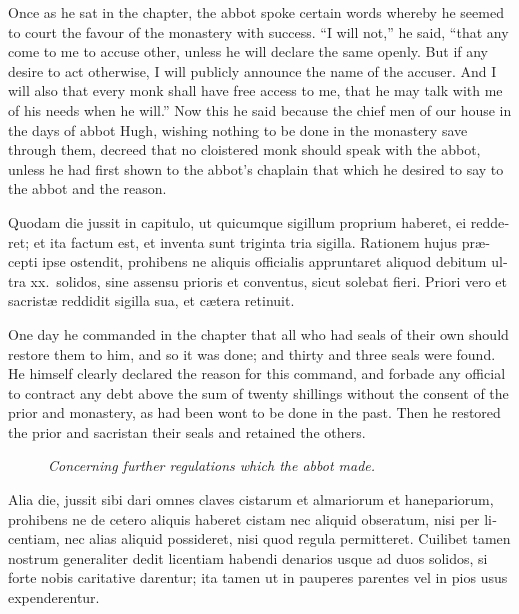\documentclass{book}
\newcommand{\blockhead}[4][]{
\begin{figure}
\centering
\vspace{#4}
\parbox{2.75cm}{\begin{center}\footnotesize \color{BrickRed} \emph{#2}\\ #1 \end{center}}
\end{figure}
}
\begin{document}
\begin{paracol}{2}
\begin{otherlanguage}{latin}
\end{otherlanguage}

\switchcolumn

Once as he sat in the chapter, the abbot spoke certain words whereby he seemed to court the favour of the monastery with success. ``I will not,'' he said, ``that any come to me to accuse other, unless he will declare the same openly. But if any desire to act otherwise, I will publicly announce the name of the accuser. And I will also that every monk shall have free access to me, that he may talk with me of his needs when he will.'' Now this he said because the chief men of our house in the days of abbot Hugh, wishing nothing to be done in the monastery save through them, decreed that no cloistered monk should speak with the abbot, unless he had first shown to the abbot's chaplain that which he desired to say to the abbot and the reason.

\switchcolumn*

\begin{otherlanguage}{latin}
Quodam die jussit in capitulo, ut quicumque  sigillum proprium haberet, ei redderet; et ita factum est, et inventa sunt triginta tria sigilla. Rationem hujus pr\ae{}cepti ipse ostendit, prohibens ne aliquis officialis appruntaret aliquod debitum ultra xx.\ solidos, sine assensu prioris et conventus, sicut solebat fieri. Priori vero et sacrist\ae{} reddidit sigilla sua, et c\ae{}tera retinuit.
\end{otherlanguage}

\switchcolumn

One day he commanded in the chapter that all who had seals of their own should restore them to him, and so it was done; and thirty and three seals were found. He himself clearly declared the reason for this command, and forbade any official to contract any debt above the sum of twenty shillings without the consent of the prior and monastery, as had been wont to be done in the past. Then he restored the prior and sacristan their seals and retained the others.

\switchcolumn*

\begin{otherlanguage}{latin}
\blockhead{Concerning further regulations which the abbot made.}{4}{-0.45cm}
Alia die, jussit sibi dari omnes claves cistarum et almariorum et hanepariorum, prohibens ne de cetero aliquis haberet cistam nec aliquid obseratum, nisi per licentiam, nec alias aliquid possideret, nisi quod regula permitteret. Cuilibet tamen nostrum generaliter dedit licentiam habendi denarios usque ad duos solidos, si forte nobis caritative darentur; ita tamen ut in pauperes parentes vel in pios usus expenderentur.


\end{otherlanguage}
\end{paracol}
\end{document}
